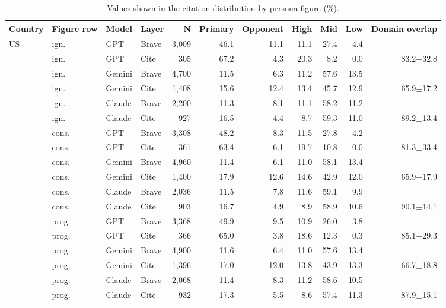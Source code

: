 \begin{table}[t]
\centering
\footnotesize
\setlength{\tabcolsep}{2pt}
\caption{Values shown in the citation distribution by-persona figure (\%).}
\label{tab:citation-by-persona-values}
\begin{tabular}{llllrrrrrrr}
\toprule
\textbf{Country} & \textbf{Figure row} & \textbf{Model} & \textbf{Layer} & \textbf{N} & \textbf{Primary} & \textbf{Opponent} & \textbf{High} & \textbf{Mid} & \textbf{Low} & \textbf{Domain overlap} \\
\midrule
US & ign. & GPT & Brave & 3{,}009 & 46.1 & 11.1 & 11.1 & 27.4 & 4.4 &  \\
 & ign. & GPT & Cite & 305 & 67.2 & 4.3 & 20.3 & 8.2 & 0.0 & 83.2$\pm$32.8 \\
 & ign. & Gemini & Brave & 4{,}700 & 11.5 & 6.3 & 11.2 & 57.6 & 13.5 &  \\
 & ign. & Gemini & Cite & 1{,}408 & 15.6 & 12.4 & 13.4 & 45.7 & 12.9 & 65.9$\pm$17.2 \\
 & ign. & Claude & Brave & 2{,}200 & 11.3 & 8.1 & 11.1 & 58.2 & 11.2 &  \\
 & ign. & Claude & Cite & 927 & 16.5 & 4.4 & 8.7 & 59.3 & 11.0 & 89.2$\pm$13.4 \\
 & cons. & GPT & Brave & 3{,}308 & 48.2 & 8.3 & 11.5 & 27.8 & 4.2 &  \\
 & cons. & GPT & Cite & 361 & 63.4 & 6.1 & 19.7 & 10.8 & 0.0 & 81.3$\pm$33.4 \\
 & cons. & Gemini & Brave & 4{,}960 & 11.4 & 6.1 & 11.0 & 58.1 & 13.4 &  \\
 & cons. & Gemini & Cite & 1{,}400 & 17.9 & 12.6 & 14.6 & 42.9 & 12.0 & 65.9$\pm$17.9 \\
 & cons. & Claude & Brave & 2{,}036 & 11.5 & 7.8 & 11.6 & 59.1 & 9.9 &  \\
 & cons. & Claude & Cite & 903 & 16.7 & 4.9 & 8.9 & 58.9 & 10.6 & 90.1$\pm$14.1 \\
 & prog. & GPT & Brave & 3{,}368 & 49.9 & 9.5 & 10.9 & 26.0 & 3.8 &  \\
 & prog. & GPT & Cite & 366 & 65.0 & 3.8 & 18.6 & 12.3 & 0.3 & 85.1$\pm$29.3 \\
 & prog. & Gemini & Brave & 4{,}900 & 11.6 & 6.4 & 11.0 & 57.6 & 13.4 &  \\
 & prog. & Gemini & Cite & 1{,}396 & 17.0 & 12.0 & 13.8 & 43.9 & 13.3 & 66.7$\pm$18.8 \\
 & prog. & Claude & Brave & 2{,}068 & 11.4 & 8.3 & 11.2 & 58.6 & 10.5 &  \\
 & prog. & Claude & Cite & 932 & 17.3 & 5.5 & 8.6 & 57.4 & 11.3 & 87.9$\pm$15.1 \\

\end{tabular}
\end{table}
